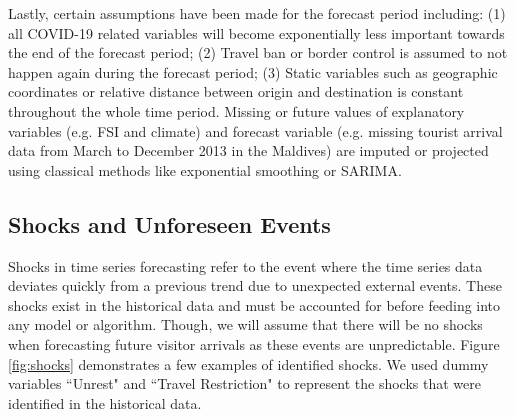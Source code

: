 \documentclass{article}
\begin{document}

Lastly, certain assumptions have been made for the forecast period including: (1) all COVID-19 related variables will become exponentially less important towards the end of the forecast period; (2) Travel ban or border control is assumed to not happen again during the forecast period; (3) Static variables such as geographic coordinates or relative distance between origin and destination is constant throughout the whole time period. Missing or future values of explanatory variables (e.g. FSI and climate) and forecast variable (e.g. missing tourist arrival data from March to December 2013 in the Maldives) are imputed or projected using classical methods like exponential smoothing or SARIMA.

\subsection{Shocks and Unforeseen Events}
\label{sect:shocks}
Shocks in time series forecasting refer to the event where the time series data deviates quickly from a previous trend due to unexpected external events. These shocks exist in the historical data and must be accounted for before feeding into any model or algorithm. Though, we will assume that there will be no shocks when forecasting future visitor arrivals as these events are unpredictable. Figure \ref{fig:shocks} demonstrates a few examples of identified shocks. We used dummy variables ``Unrest" and ``Travel Restriction" to represent the shocks that were identified in the historical data.
\end{document}
